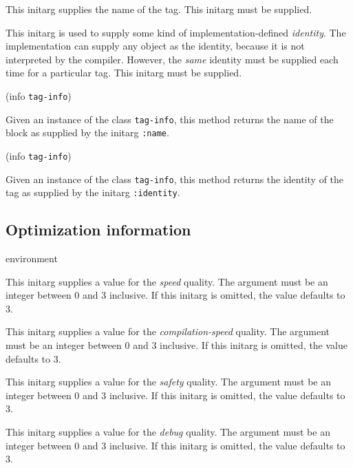 This initarg supplies the name of the tag.  This initarg must be
supplied.


This initarg is used to supply some kind of implementation-defined 
\emph{identity}.  The implementation can supply any object as the
identity, because it is not interpreted by the compiler.  However, the
\emph{same} identity must be supplied each time for a particular
tag.  This initarg must be supplied. 

 {(info {\tt tag-info})}

Given an instance of the class \texttt{tag-info}, this method
returns the name of the block as supplied by the initarg
\texttt{:name}.

 {(info {\tt tag-info})}

Given an instance of the class \texttt{tag-info}, this method
returns the identity of the tag as supplied by the initarg
\texttt{:identity}.

\subsection{Optimization information}

 {environment}



This initarg supplies a value for the \emph{speed} quality.  The
argument must be an integer between $0$ and $3$ inclusive.  If this
initarg is omitted, the value defaults to $3$.


This initarg supplies a value for the \emph{compilation-speed}
quality.  The argument must be an integer between $0$ and $3$
inclusive.  If this initarg is omitted, the value defaults to $3$.


This initarg supplies a value for the \emph{safety} quality.  The
argument must be an integer between $0$ and $3$ inclusive.  If this
initarg is omitted, the value defaults to $3$.


This initarg supplies a value for the \emph{debug} quality.  The
argument must be an integer between $0$ and $3$ inclusive.  If this
initarg is omitted, the value defaults to $3$.


